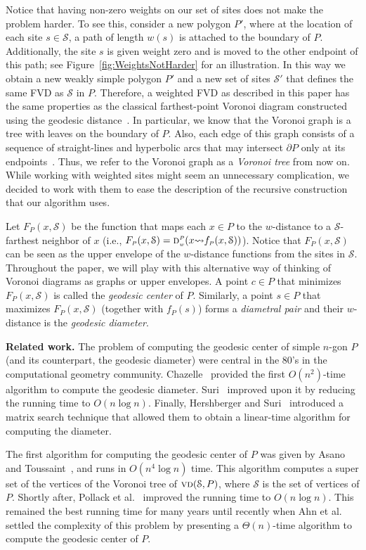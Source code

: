 \documentclass[a4paper,UKenglish]{socg-lipics-v2018}
\newcommand{\F}[2][P]{\ensuremath{F_{\scriptscriptstyle #1}(#2)}}
\newcommand{\s}{\mathcal S}
\newcommand{\dd}[3][P]{\ensuremath{\textsc{d}_{\scriptscriptstyle w}^{\scriptscriptstyle #1}(#2 {\leadsto} #3)}}
\newcommand{\f}[2][P]{\ensuremath{f_{\scriptscriptstyle #1}(#2)}}
\newcommand{\vd}[2][P]{\textsc{vd}(#2, #1)}
\begin{document}
Notice that having non-zero weights on our set of sites does not make the problem harder. 
To see this, consider a new polygon $P'$, where at the location of each site $s\in \s$, a path of length $w(s)$ is attached to the boundary of $P$. 
Additionally, the site $s$ is given weight zero and is moved to the other endpoint of this path; see Figure~\ref{fig:WeightsNotHarder} for an illustration. 
In this way we obtain a new weakly simple polygon $P'$ and a new set of sites $\s'$ that defines the same FVD as $\s$ in $P$. 
Therefore, a weighted FVD as described in this paper has the same properties as the classical farthest-point Voronoi diagram constructed using the geodesic distance~\cite{aronov1993furthest}. 
In particular, we know that the Voronoi graph is a tree with leaves on the boundary of $P$.
Also, each edge of this graph consists of a sequence of straight-lines and hyperbolic arcs that may intersect $\partial P$ only at its endpoints~\cite{aronov1993furthest}. 
Thus, we refer to the Voronoi graph as a \emph{Voronoi tree} from now on.
While working with weighted sites might seem an unnecessary complication, we decided to work with them to ease the description of the recursive construction that our algorithm uses. 

Let $\F{x, \s}$ be the function that maps each $x\in P$ to the $w$-distance to a $\s$-farthest neighbor of $x$ (i.e., $\F{x, \s} = \dd{x}{\f{x, \s}}$).
Notice that $\F{x, \s}$ can be seen as the upper envelope of the $w$-distance functions from the sites in $\s$.
Throughout the paper, we will play with this alternative way of thinking of Voronoi diagrams as graphs or upper envelopes.
A point $c\in P$ that minimizes $\F{x, \s}$ is called the \emph{geodesic center} of $P$. 
Similarly, a point $s\in P$ that maximizes $\F{x, \s}$ (together with $\f{s}$) forms a \emph{diametral pair} and their $w$-distance is the \emph{geodesic diameter}. 


\textbf{Related work.} 
The problem of computing the geodesic center of simple $n$-gon $P$ (and its counterpart, the geodesic diameter) were central in the 80's in the computational geometry community. 
Chazelle~\cite{c-tpca-82} provided the first $O(n^2)$-time algorithm to compute the geodesic diameter.
Suri~\cite{suri1989computing} improved upon it by reducing the running time to $O(n\log n)$. 
Finally, Hershberger and Suri~\cite{hershberger1993matrix} introduced a matrix search technique that allowed them to obtain a linear-time algorithm for computing the diameter.

The first algorithm for computing the geodesic center of $P$ was given by Asano and Toussaint~\cite{at-cgcsp-85}, and runs in $O(n^4\log n)$ time.  
This algorithm computes a super set of the vertices of the Voronoi tree of $\vd{\s}$, where $\s$ is the set of vertices of $P$.  
Shortly after, Pollack et al.~\cite{pollackComputingCenter} improved the running time to $O(n\log n)$.  
This remained the best running time for many years until recently when Ahn et al.~\cite{ahn2015linear} settled the complexity of this problem by presenting a $\Theta(n)$-time algorithm to compute the geodesic center of $P$. 
\end{document}
